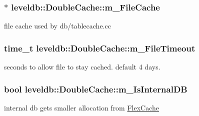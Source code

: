 \subsubsection[{m\+\_\+\+File\+Cache}]{$\ast$ leveldb\+::\+Double\+Cache\+::m\+\_\+\+File\+Cache\hspace{0.3cm}{\ttfamily [protected]}}\label{classleveldb_1_1_double_cache_aae6771693bdd6eef7171b146af5744ff}


file cache used by db/tablecache.\+cc 

\hypertarget{classleveldb_1_1_double_cache_a1eb779a94cdb5df86333377f365df2b2}{}
\subsubsection[{m\+\_\+\+File\+Timeout}]{\setlength{\rightskip}{0pt plus 5cm}time\+\_\+t leveldb\+::\+Double\+Cache\+::m\+\_\+\+File\+Timeout\hspace{0.3cm}{\ttfamily [protected]}}\label{classleveldb_1_1_double_cache_a1eb779a94cdb5df86333377f365df2b2}


seconds to allow file to stay cached. default 4 days. 

\hypertarget{classleveldb_1_1_double_cache_aead367778b68bc2b42d00d20e5739944}{}
\subsubsection[{m\+\_\+\+Is\+Internal\+D\+B}]{\setlength{\rightskip}{0pt plus 5cm}bool leveldb\+::\+Double\+Cache\+::m\+\_\+\+Is\+Internal\+D\+B\hspace{0.3cm}{\ttfamily [protected]}}\label{classleveldb_1_1_double_cache_aead367778b68bc2b42d00d20e5739944}


internal db gets smaller allocation from \hyperlink{classleveldb_1_1_flex_cache}{Flex\+Cache} 

\hypertarget{classleveldb_1_1_double_cache_a76eda02c403cf6bc7f225f612ce098ff}{}
